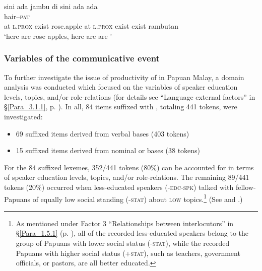 \ea
\label{Example_3.20}
 {sini} {ada} {jambu} {di} {sini} {ada} {ada} \\ %
 {} {} {} {} {} {} {} {} hair–\textsc{pat}\\
 at  \textsc{l.prox}  exist  rose.apple  at  \textsc{l.prox}  exist  exist  rambutan\\
\glt
‘here are rose apples, here are are ’ \textstyleExampleSource{[081029-001-Cv.0006]}
\z

\subsubsection[Variables of the {communicative event}]{Variables of the communicative event}\label{Para_3.1.3.3}

To further investigate the issue of productivity of  in Papuan Malay, a domain analysis was conducted which focused on the variables of speaker education levels, topics, and/or role-relations (for details see ``Language external factors'' in §\ref{Para_3.1.1}, p. \pageref{List_3.2}). In all, 84 items suffixed with , totaling 441 tokens, were investigated:


\begin{itemize}
\item 
69 suffixed items derived from verbal bases (403 tokens)

\item 
15 suffixed items derived from nominal or  bases (38 tokens)

\end{itemize}

For the 84 suffixed lexemes, 352/441 tokens (80\%) can be accounted for in terms of speaker education levels, topics, and/or role-relations. The remaining 89/441 tokens (20\%) occurred when less-educated speakers (\textsc{-edc-spk}) talked with fellow-Papuans of equally low social standing (\textsc{-stat}) about \textsc{low} topics.\footnote{As mentioned under Factor 3 ``Relationships between interlocutors'' in §\ref{Para_1.5.1} (p. \pageref{Item_1.3}), all of the recorded less-educated speakers belong to the group of Papuans with lower social status (\textsc{-stat}), while the recorded Papuans with higher social status (\textsc{+stat}), such as teachers, government officials, or pastors, are all better educated.} (See  and .)



